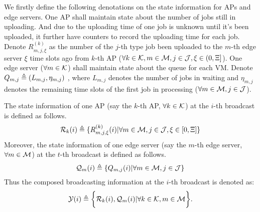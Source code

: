 We firstly define the following denotations on the state information for APs and edge servers.
One AP shall maintain state about the number of jobs still in uploading. 
And due to the uploading time of one job is unknown until it's been uploaded, it further have counters to record the uploading time for each job.
Denote $R^{(k)}_{m,j,\xi}$ as the number of the $j$-th type job been uploaded to the $m$-th edge server $\xi$ time slots ago from $k$-th AP ($\forall k\in\mathcal{K}, m\in\mathcal{M}, j\in\mathcal{J}, \xi\in(0,\Xi]$).
%
One edge server ($\forall m\in\mathcal{K}$) shall maintain state about the queue for each VM.
Denote $Q_{m,j} \triangleq (L_{m,j}, \eta_{m,j})$ , where $L_{m,j}$ denotes the number of jobs in waiting and $\eta_{m,j}$ denotes the remaining time slots of the first job in processing ($\forall m\in\mathcal{M}, j\in\mathcal{J}$). 

The state information of one AP (say the $k$-th AP, $\forall k\in\mathcal{K}$) at the $i$-th broadcast is defined as follows.
\begin{align}
    \mathcal{R}_{k}(i) \triangleq \{R^{(k)}_{m,j,\xi}(i) | \forall m\in\mathcal{M}, j\in\mathcal{J}, \xi \in [0,\Xi]\}
\end{align}
Moreover, the state information of one edge server (say the $m$-th edge server, $\forall m\in\mathcal{M}$) at the $t$-th broadcast is defined as follows.
\begin{align}
    \mathcal{Q}_{m}(i) \triangleq \{Q_{m,j}(i) | \forall m\in\mathcal{M}, j\in\mathcal{J}\}
\end{align}
Thus the composed broadcasting information at the $i$-th broadcast is denoted as:
\begin{align}
    \mathcal{Y}(i) \triangleq
        \bigg\{
            \mathcal{R}_{k}(i), \mathcal{Q}_{m}(i) | \forall k\in\mathcal{K}, m\in\mathcal{M}
        \bigg\}.
\end{align}

